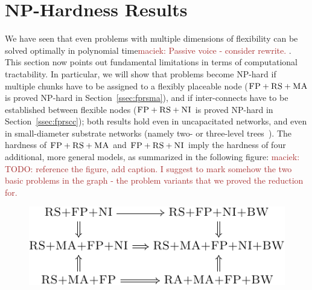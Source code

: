 \documentclass[9pt]{sigcomm-alternate}
\newcommand{\carlo}[1]{\textcolor{red}{carlo: #1}}
\newcommand{\maciek}[1]{\textcolor{brown}{maciek: #1}}
\newcommand{\CC}{\textsc{NI}}
\newcommand{\FP}{\textsc{FP}}
\newcommand{\RS}{\textsc{RS}}
\newcommand{\MA}{\textsc{MA}}
\begin{document}
\section{NP-Hardness Results}\label{sec:np}


We have seen that even problems with multiple dimensions of
flexibility can be solved optimally in polynomial time\maciek{Passive voice - consider rewrite.}
.
This section now points out fundamental
limitations in terms of computational tractability. In particular, we
will show that problems become NP-hard if multiple chunks have to be
assigned to a flexibly placeable node ($\FP+\RS+\MA$ is proved NP-hard in
Section~\ref{ssec:fprsma}), and if inter-connects have to be established
between flexible nodes ($\FP+\RS+\CC$ is proved NP-hard in Section~\ref{ssec:fprscc}); both
results hold even in uncapacitated networks, and even in small-diameter
substrate networks (namely two- or three-level trees~\cite{fattree}).
The hardness of $\FP+\RS+\MA$ and $\FP+\RS+\CC$ imply
the hardness of four additional, more general models, as
summarized in the following figure: \maciek{TODO: reference the figure, add caption. I suggest to mark somehow the two basic problems in the graph - the problem variants that we proved the reduction for.}

\begin{figure}[htbp]
\small
\includegraphics[width = \columnwidth]{figs/np_implications}
\end{figure}
\end{document}

